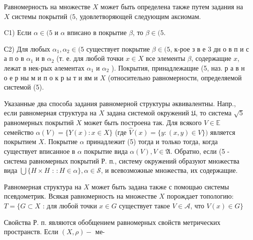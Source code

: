 \documentclass[10pt]{article}
\begin{document}
Равномерность на множестве $X$ может быть определена также путем задания на $X$ системы покрытий $(5$, удовлетворяющей следующим аксиомам.



C1) Если $\alpha \in(5$ и $\alpha$ вписано в покрытие $\beta$, то $\beta \in(5$.



С2) Для любых $\alpha_{1}, \alpha_{2} \in(5$ существует покрытие $\beta \in(5$, к-рое з в е 3 дн о в п и с а п о в $\alpha_{1}$ и в $\alpha_{2}$ (т. е. для любой точки $x \in X$ все элементы $\beta$, содержащие $x$, лежат в нек-рых әлементах $\alpha_{1}$ и $\alpha_{2}$ ). Покрытия, принадлежащие (5, наз. р а в н о е р ны м и п о к р ы т и ям и $X$ (относительно равномерности, определяемой системой (5).



Указанные два способа задания равномерной структуры әквивалентны. Напр., если равномерная структура на $X$ задана системой окружений $\mathfrak{U}$, то система $\sqrt{5}$ равномерных покрытий $X$ может быть построена так. Для всякого $V \in \mathbb{E}$ семейство $\alpha(V)=\{Y(x): x \in X\}$ (где $\widehat{V}(x)=\{y:(x, y) \in V\})$ является покрытием $X$. Покрытие $\alpha$ принадлежит (5) тогда и только тогда, когда существует вписанное в $\alpha$ покрытие вида $\alpha(V), V \in \mathfrak{A}$. Обратно, если (5 - система равномерных покрытий Р. п., систему окружений образуют множества вида $\bigcup\{H \times H$ : $: H \in \alpha\}, \alpha \in \mathcal{S}$, и всевозможные множества, их содержащие.



Равномерная структура на $X$ может быть задана также с помощью системы псевдометрик. Всякая равномерность на множестве $X$ порождает топологию: $T=\{G \subset X$ : для любой точки $x \in G$ существует такое $V \in \mathscr{A}$, что $V(x) \in G\}$



Свойства Р. п. являются обобщением равномерных свойств метрических пространств. Если $(X, \rho)-$ ме-
\end{document}
